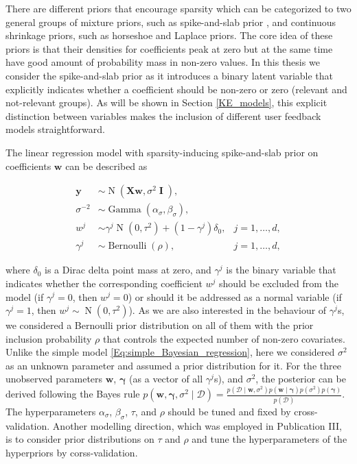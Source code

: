 \documentclass[dissertation,math,vertlayout,pdfa,colorlinks]{aaltoseries}
\newcommand{\bw}{\bm{w}}
\newcommand{\bX}{\bm{X}}
\newcommand{\by}{\bm{y}}
\newcommand{\bD}{\mathcal{D}}
\DeclareMathOperator{\eye}{\textbf{I}}
\DeclareMathOperator{\bernoullipdf}{Bernoulli}
\DeclareMathOperator{\normalpdf}{N}
\DeclareMathOperator{\gammapdf}{Gamma}
\begin{document}
There are different priors that encourage sparsity which can be categorized to two general groups of mixture priors, such as spike-and-slab prior \cite{spike_slab1993}, and continuous shrinkage priors, such as horseshoe \cite{horseshoe_2017} and Laplace \cite{seeger2008bayesian} priors. The core idea of these priors is that their densities for coefficients peak at zero but at the same time have good amount of probability mass in non-zero values. In this thesis we consider the spike-and-slab prior as it introduces a binary latent variable that explicitly indicates whether a coefficient should be non-zero or zero (relevant and not-relevant groups). As will be shown in Section \ref{KE_models}, this explicit distinction between variables makes the inclusion of different user feedback models straightforward.%

The linear regression model with sparsity-inducing spike-and-slab prior on coefficients $\bw$ can be described as

\begin{align}\label{Eq:ss_Bayesian_regression}
\by &\sim \normalpdf(\bX\bw,\sigma^2 \eye), \\
\sigma^{-2} &\sim \gammapdf(\alpha_{\sigma}, \beta_{\sigma}), \nonumber \\
w^j &\sim \gamma^j \normalpdf(0, \tau^2) + (1 - \gamma^j) \delta_0,  & j=1,\ldots,d, \nonumber\\
\gamma^j &\sim \bernoullipdf(\rho), & j=1,\ldots,d, \nonumber
\end{align}

\noindent where $\delta_0$ is a Dirac delta point mass at zero, and $\gamma^j$ is the binary variable that indicates whether the corresponding coefficient $w^j$ should be excluded from the model (if $\gamma^j=0$, then $w^j=0$) or should it be addressed as a normal variable (if $\gamma^j=1$, then $w^j \sim \normalpdf(0, \tau^2)$). As we are also interested in the behaviour of $\gamma^j$s, we considered a Bernoulli prior distribution on all of them with the prior inclusion probability $\rho$ that controls the expected number of non-zero covariates. Unlike the simple model \ref{Eq:simple_Bayesian_regression}, here we considered $\sigma^{2}$ as an unknown parameter and assumed a prior distribution for it. For the three unobserved parameters $\bw$, $\bm{\gamma}$ (as a vector of all $\gamma^j$s), and $\sigma^2$, the posterior can be derived following the Bayes rule $p(\bw, \bm{\gamma}, \sigma^2 \mid \bD) = \frac{p(\bD \mid \bw, \sigma^2)p(\bw \mid \bm{\gamma})p(\sigma^2)p(\bm{\gamma})}{p(\bD)}$. The hyperparameters $\alpha_{\sigma}$, $\beta_{\sigma}$, $\tau$, and $\rho$ should be tuned and fixed by cross-validation. Another modelling direction, which was employed in Publication III, is to consider prior distributions on $\tau$ and $\rho$ and tune the hyperparameters of the hyperpriors by corss-validation.  %
\end{document}
